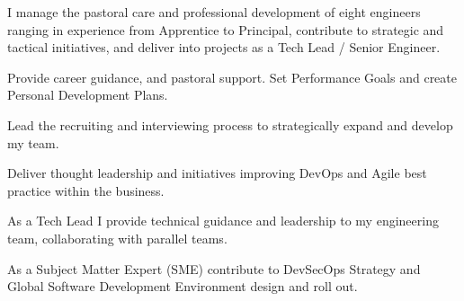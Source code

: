 I manage the pastoral care and professional development of eight engineers ranging in experience from Apprentice to Principal, contribute to strategic and tactical initiatives, and deliver into projects as a Tech Lead / Senior Engineer.
\vspace{0.25em}
\begin{tightemize}
  \item Provide career guidance, and pastoral support. Set Performance Goals and create Personal Development Plans.
  \item Lead the recruiting and interviewing process to strategically expand and develop my team.
  \item Deliver thought leadership and initiatives improving DevOps and Agile best practice within the business.
  \item As a Tech Lead I provide technical guidance and leadership to my engineering team, collaborating with parallel teams.
  \item As a Subject Matter Expert (SME) contribute to DevSecOps Strategy and Global Software Development Environment design and roll out.
\end{tightemize}
\sectionsep{}
\vfill{}